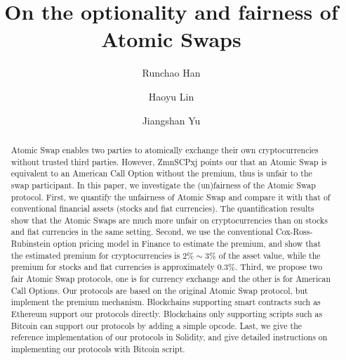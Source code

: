 \documentclass[sigconf, natbib=false]{acmart}
\renewcommand\_{\textunderscore\allowbreak}
\begin{document}
\title{On the optionality and fairness of Atomic Swaps}

\author{Runchao Han}

\author{Haoyu Lin}
\affiliation{%
  \institution{}
}

\author{Jiangshan Yu}

\begin{abstract}
Atomic Swap enables two parties to atomically exchange their own cryptocurrencies without trusted third parties.
However, ZmnSCPxj points our that an Atomic Swap is equivalent to an American Call Option without the premium, thus is unfair to the swap participant.
In this paper, we investigate the (un)fairness of the Atomic Swap protocol.
First, we quantify the unfairness of Atomic Swap and compare it with that of conventional financial assets (stocks and fiat currencies).
The quantification results show that the Atomic Swaps are much more unfair on cryptocurrencies than on stocks and fiat currencies in the same setting.
Second, we use the conventional Cox-Ross-Rubinstein option pricing model in Finance to estimate the premium, and show that the estimated premium for cryptocurrencies is $2\% \sim 3\%$ of the asset value, while the premium for stocks and fiat currencies is approximately $0.3\%$.
Third, we propose two fair Atomic Swap protocols,
one is for currency exchange and the other is for American Call Options.
Our protocols are based on the original Atomic Swap protocol, but implement the premium mechanism.
Blockchains supporting smart contracts such as Ethereum support our protocols directly.
Blockchains only supporting scripts such as Bitcoin can support our protocols by adding a simple opcode.
Last, we give the reference implementation of our protocols in Solidity, and give detailed instructions on implementing our protocols with Bitcoin script.
\end{abstract}


\maketitle














\printbibliography


\end{document}
